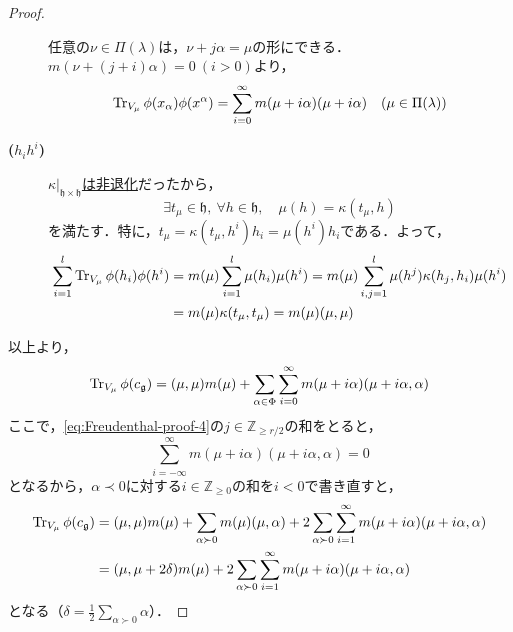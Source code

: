 \documentclass[rep_main]{subfiles}
\begin{document}
\begin{proof}
\begin{description}
		任意の$\nu \in \Pi(\lambda)$は，$\nu + j\alpha = \mu$の形にできる．$m(\nu + (j + i)\alpha) = 0\ (i > 0)$より，
		\begin{equation}
			\Tr_{V_\mu} \phi(x_\alpha)\phi(x^\alpha) = \sum_{i=0}^\infty m(\mu + i\alpha)(\mu + i\alpha)\quad  (\mu \in \Pi(\lambda))
		\end{equation}

	\item[\textbf{($h_ih^i$)}] \hyperref[col:torus-centralizer]{$\kappa|_{\mathfrak{h}\times\mathfrak{h}}$は非退化}だったから，
		\begin{equation}
			\exists t_\mu \in \mathfrak{h},\ \forall h \in \mathfrak{h},\quad  \mu(h) = \kappa(t_\mu, h)
		\end{equation}
		を満たす．特に，$t_\mu = \kappa(t_\mu, h^i)h_i = \mu(h^i)h_i$である．よって，
		\begin{align}
			\sum_{i=1}^l\Tr_{V_\mu} \phi(h_i)\phi(h^i) &= m(\mu)\sum_{i=1}^l\mu(h_i)\mu(h^i) = m(\mu)\sum_{i,j=1}^l\mu(h^j)\kappa(h_j, h_i)\mu(h^i) \\
			&= m(\mu)\kappa(t_\mu, t_\mu) = m(\mu)(\mu, \mu)
		\end{align}
	\end{description}
	以上より，
	\begin{equation}
		\Tr_{V_\mu} \phi(c_\mathfrak{g}) = (\mu, \mu)m(\mu) + \sum_{\alpha \in \Phi} \sum_{i=0}^\infty m(\mu + i\alpha)(\mu + i\alpha, \alpha)
	\end{equation}
	ここで，\eqref{eq:Freudenthal-proof-4}の$j \in \mathbb{Z}_{\geq r/2}$の和をとると，
	\begin{equation}
		\sum_{i=-\infty}^\infty m(\mu + i\alpha)(\mu + i\alpha, \alpha) = 0
	\end{equation}
	となるから，$\alpha \prec 0$に対する$i \in \mathbb{Z}_{\geq 0}$の和を$i < 0$で書き直すと，
	\begin{align}
		\Tr_{V_\mu} \phi(c_\mathfrak{g}) &= (\mu, \mu)m(\mu) + \sum_{\alpha \succ 0} m(\mu)(\mu, \alpha) + 2\sum_{\alpha \succ 0} \sum_{i=1}^\infty m(\mu + i\alpha)(\mu + i\alpha, \alpha) \\
		&= (\mu, \mu + 2\delta)m(\mu) + 2\sum_{\alpha \succ 0} \sum_{i=1}^\infty m(\mu + i\alpha)(\mu + i\alpha, \alpha)
	\end{align}
	となる（$\delta = \frac{1}{2}\sum_{\alpha \succ 0} \alpha$）．
\end{proof}
\end{document}
